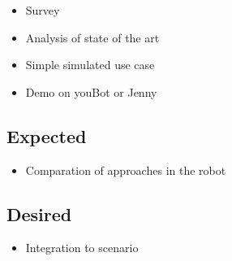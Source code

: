 \documentclass[thesis]{mas_proposal}
\begin{document}
\begin{itemize}
    \item Survey
    \item Analysis of state of the art
    \item Simple simulated use case
    \item Demo on youBot or Jenny
\end{itemize}

\subsection{Expected}
\begin{itemize}
    \item Comparation of approaches in the robot
\end{itemize}

\subsection{Desired}
\begin{itemize}
    \item Integration to scenario
\end{itemize}


\nocite{*}

\end{document}
